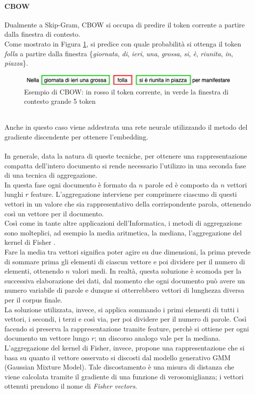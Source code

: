 \documentclass[12pt]{report}
\theoremstyle{definition}
\begin{document}
\paragraph{CBOW}
Dualmente a Skip-Gram, CBOW si occupa di predire il token corrente a partire dalla finestra di contesto.
\\
Come mostrato in Figura \ref{cbow}, si predice con quale probabilità si ottenga il token \textit{folla} a partire dalla finestra \{\textit{giornata}, \textit{di}, \textit{ieri}, \textit{una}, \textit{grossa}, \textit{si}, \textit{è}, \textit{riunita}, \textit{in}, \textit{piazza}\}.
\\
\begin{figure}
    \centering
    \includegraphics[scale = 0.7]{images/cbow.png}
    \caption{Esempio di CBOW: in rosso il token corrente, in verde la finestra di contesto grande 5 token}
    \label{cbow}
\end{figure}
\\
Anche in questo caso viene addestrata una rete neurale utilizzando il metodo del gradiente discendente per ottenere l'embedding.
\\
\\
In generale, data la natura di queste tecniche, per ottenere una rappresentazione compatta dell'intero documento si rende necessario l'utilizzo in una seconda fase di una tecnica di aggregazione.
\\
In questa fase ogni documento è formato da $n$ parole ed è composto da $n$ vettori lunghi $r$ feature. L'aggregazione interviene per comprimere ciascuno di questi vettori in un valore che sia rappresentativo della corrispondente parola, ottenendo così un vettore per il documento.
\\
Così come in tante altre applicazioni dell'Informatica, i metodi di aggregazione sono molteplici, ad esempio la media aritmetica, la mediana, l'aggregazione del kernel di Fisher \cite{19}.
\\
Fare la media tra vettori significa poter agire su due dimensioni, la prima prevede di sommare prima gli elementi di ciascun vettore e poi dividere per il numero di elementi, ottenendo $n$ valori medi. In realtà, questa soluzione è scomoda per la successiva elaborazione dei dati, dal momento che ogni documento può avere un numero variabile di parole e dunque si otterrebbero vettori di lunghezza diversa per il corpus finale.
\\
La soluzione utilizzata, invece, si applica sommando i primi elementi di tutti i vettori, i secondi, i terzi e così via, per poi dividere per il numero di parole. Così facendo si preserva la rappresentazione tramite feature, perchè si ottiene per ogni documento un vettore lungo $r$; un discorso analogo vale per la mediana.
\\
L'aggregazione del kernel di Fisher, invece, propone una rappresentazione che si basa su quanto il vettore osservato si discosti dal modello generativo GMM (Gaussian Mixture Model). Tale discostamento è una misura di distanza che viene calcolata tramite il gradiente di una funzione di verosomiglianza; i vettori ottenuti prendono il nome di \textit{Fisher vectors}.
\end{document}
